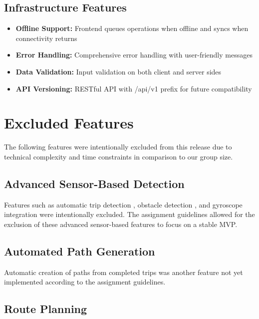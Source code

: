 \subsection{Infrastructure Features}
\label{subsec:impl_infrastructure}

\begin{itemize}
    \item \textbf{Offline Support:} Frontend queues operations when offline and syncs when connectivity returns
    \item \textbf{Error Handling:} Comprehensive error handling with user-friendly messages
    \item \textbf{Data Validation:} Input validation on both client and server sides
    \item \textbf{API Versioning:} RESTful API with /api/v1 prefix for future compatibility
\end{itemize}

\section{Excluded Features}
\label{sec:excluded_features}

The following features were intentionally excluded from this release due to technical complexity and time constraints in comparison to our group size.

\subsection{Advanced Sensor-Based Detection}
\label{subsec:excluded_sensors}

Features such as automatic trip detection , obstacle detection , and gyroscope integration were intentionally excluded. The assignment guidelines allowed for the exclusion of these advanced sensor-based features to focus on a stable MVP.


\subsection{Automated Path Generation} 
\label{subsec:excluded_automated_path_generation}
  
Automatic creation of paths from completed trips was another feature not yet implemented according to the assignment guidelines.

 \subsection {Route Planning}
\label{subsec:excluded_route_planning}

